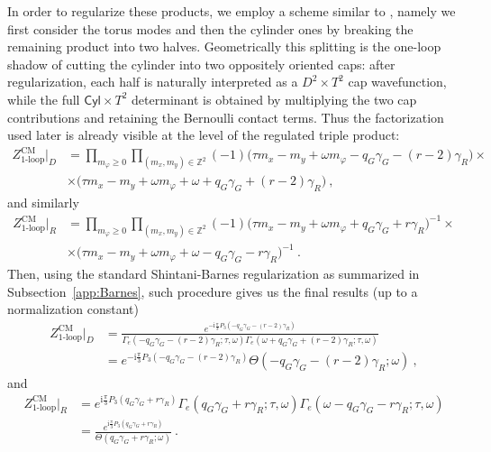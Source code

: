 \documentclass[11pt,a4paper]{article}
\numberwithin{equation}{section}
\theoremstyle{plain}
\theoremstyle{definition}
\theoremstyle{remark}
\newcommand{\ii}{\mathrm{i}}
\newcommand{\nn}{\nonumber}
\newcommand{\cyl}{\mathsf{Cyl}}
\begin{document}
In order to regularize these products, we employ a scheme similar to \cite{Barnes1904,Shintani1976}, namely we first consider the torus modes and then the cylinder ones by breaking the remaining product into two halves.  Geometrically this splitting is the one-loop shadow of cutting the cylinder into two oppositely oriented caps: after regularization, each half is naturally interpreted as a \(D^2\times T^2\) cap wavefunction, while the full \(\cyl\times T^2\) determinant is obtained by multiplying the two cap contributions and retaining the Bernoulli contact terms.  Thus the factorization used later is already visible at the level of the regulated triple product:
\begin{align}
Z^{\mathrm{CM}}_{\mathrm{1\mbox{-}loop}}\big|_{D} 
& =
\prod_{m_\varphi\geq 0}\prod_{(m_x,m_y)\in\mathbb{Z}^2}
(-1)\Big(\tau m_x-m_y+\omega m_\varphi-q_G\gamma_G-(r-2)\gamma_R\Big)\times\nn\\
& \times \Big(\tau m_x-m_y+\omega m_\varphi+\omega+q_G\gamma_G+(r-2)\gamma_R\Big)~,
\end{align}
and similarly 
\begin{align}
Z^{\mathrm{CM}}_{\mathrm{1\mbox{-}loop}}\big|_{R} 
& =
\prod_{m_\varphi\geq 0}\prod_{(m_x,m_y)\in\mathbb{Z}^2}
(-1)\Big(\tau m_x-m_y+\omega m_\varphi+q_G\gamma_G+r\gamma_R\Big)^{-1}\times\nn\\
& \times \Big(\tau m_x-m_y+\omega m_\varphi+\omega-q_G\gamma_G-r\gamma_R\Big)^{-1}~.
\end{align}
Then, using the standard Shintani-Barnes regularization as summarized in Subsection~\ref{app:Barnes}, such procedure gives us the final results (up to a normalization constant)
\begin{align}
Z^{\mathrm{CM}}_{\mathrm{1\mbox{-}loop}}\big|_{D} 
& = \frac{e^{-\ii\frac{\pi}{3}P_3(-q_G\gamma_G-(r-2)\gamma_R)}}{\Gamma_e(-q_G\gamma_G-(r-2)\gamma_R;\tau,\omega)\Gamma_e(\omega+q_G\gamma_G+(r-2)\gamma_R;\tau,\omega)} \nn\\
& =e^{-\ii\frac{\pi}{3}P_3(-q_G\gamma_G-(r-2)\gamma_R)} \Theta(-q_G\gamma_G-(r-2)\gamma_R;\omega)~,
\end{align}
and
\begin{align}
Z^{\mathrm{CM}}_{\mathrm{1\mbox{-}loop}}\big|_{R} 
& = e^{\ii\frac{\pi}{3}P_3(q_G\gamma_G+r\gamma_R)}\Gamma_e(q_G\gamma_G+r\gamma_R;\tau,\omega)\Gamma_e(\omega-q_G\gamma_G-r\gamma_R;\tau,\omega) \nn\\
& =\frac{e^{\ii\frac{\pi}{3}P_3(q_G\gamma_G+r\gamma_R)}}{\Theta(q_G\gamma_G+r\gamma_R;\omega)}~.\
\end{align}
\end{document}
